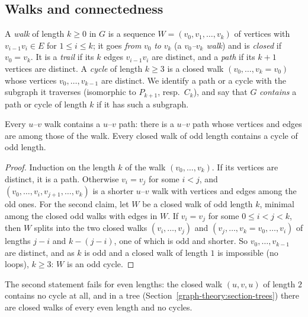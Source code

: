 \subsection{Walks and connectedness}\label{graph-theory:subsection-walks}

\begin{definition}\label{graph-theory:definition-walk}
A \emph{walk} of length $k \geq 0$ in $G$ is a sequence $W = (v_0, v_1, \ldots, v_k)$ of vertices with $v_{i-1}v_i \in E$ for $1 \leq i \leq k$; it goes \emph{from} $v_0$ \emph{to} $v_k$ (a
\emph{$v_0$--$v_k$ walk}) and is \emph{closed} if $v_0 = v_k$. It is a \emph{trail} if its $k$ edges $v_{i-1}v_i$ are distinct, and a \emph{path} if its $k + 1$ vertices are distinct. A \emph{cycle}
of length $k \geq 3$ is a closed walk $(v_0, \ldots, v_k = v_0)$ whose vertices $v_0, \ldots, v_{k-1}$ are distinct. We identify a path or a cycle with the subgraph it traverses (isomorphic to
$P_{k+1}$, resp.\ $C_k$), and say that $G$ \emph{contains} a path or cycle of length $k$ if it has such a subgraph.
\end{definition}

\begin{lemma}\label{graph-theory:lemma-walk-path}
Every $u$--$v$ walk contains a $u$--$v$ path: there is a $u$--$v$ path whose vertices and edges are among those of the walk. Every closed walk of odd length contains a cycle of odd length.
\end{lemma}

\begin{proof}
Induction on the length $k$ of the walk $(v_0, \ldots, v_k)$. If its vertices are distinct, it is a path. Otherwise $v_i = v_j$ for some $i < j$, and $(v_0, \ldots, v_i, v_{j+1}, \ldots, v_k)$ is a
shorter $u$--$v$ walk with vertices and edges among the old ones. For the second claim, let $W$ be a closed walk of odd length $k$, minimal among the closed odd walks with edges in $W$. If
$v_i = v_j$ for some $0 \leq i < j < k$, then $W$ splits into the two closed walks $(v_i, \ldots, v_j)$ and $(v_j, \ldots, v_k = v_0, \ldots, v_i)$ of lengths $j - i$ and $k - (j - i)$, one of
which is odd and shorter. So $v_0, \ldots, v_{k-1}$ are distinct, and as $k$ is odd and a closed walk of length $1$ is impossible (no loops), $k \geq 3$: $W$ is an odd cycle.
\end{proof}

\begin{counterexample}\label{graph-theory:counterexample-even-walk}
The second statement fails for even lengths: the closed walk $(u, v, u)$ of length $2$ contains no cycle at all, and in a tree (Section~\ref{graph-theory:section-trees}) there are closed walks of
every even length and no cycles.
\end{counterexample}

